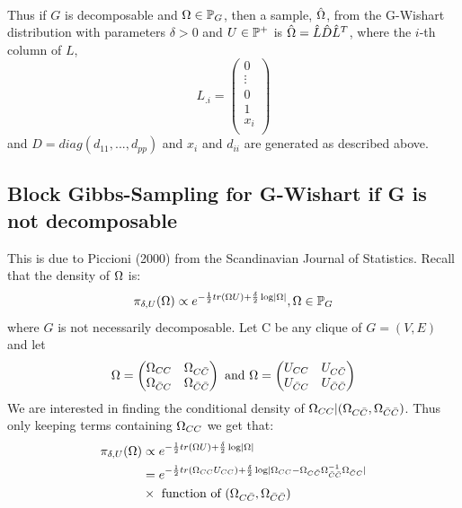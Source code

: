\documentclass[12pt, leqno]{article}
\providecommand{\abs}[1]{\lvert#1\rvert}
\let\oldhat\hat
\renewcommand{\hat}[1]{\oldhat{{#1}}}
\def\om{\ensuremath\Omega}
\def\pd{\ensuremath\mathbb{P}^+}
\def\pg{\ensuremath\mathbb{P}_{{G}}}
\begin{document}
\paragraph{} Thus if $G$ is decomposable and $\om \in \pg$, then a sample, $\hat{\om}$, from
the G-Wishart distribution with parameters $\delta>0$ and $U \in \pd$
is $\hat{\om} = \hat{L}\hat{D}\hat{L}^T$, where the $i$-th column of $L$,
\[
L_{.i} = \begin{pmatrix}0\\
\vdots\\
0\\
1\\
x_i\\
\end{pmatrix}
\]
and $D = diag(d_{11},...,d_{pp})$ and $x_i$ and $d_{ii}$ are generated
as described above.
\subsection{Block Gibbs-Sampling for G-Wishart if G is not decomposable}
This is due to Piccioni
(2000) from the Scandinavian Journal of Statistics. Recall that the
density of $\om$ is:
\[
\pi_{\delta,U}(\om) \propto e^{-\frac{1}{2}tr(\om U) +
  \frac{\delta}{2} \log \abs{\om}}, \om \in \pg
\]
where $G$ is not necessarily decomposable. 
Let C be any clique of $G = (V,E)$ and let 
\begin{align*}
\om = \begin{pmatrix} \om_{CC} & \om_{C\bar{C}} \\
\om_{\bar{C}C} & \om_{\bar{C} \bar{C}} 
\end{pmatrix}
\text{ and }
\om = \begin{pmatrix} U_{CC} & U_{C\bar{C}} \\
U_{\bar{C}C} & U_{\bar{C} \bar{C}} 
\end{pmatrix}
\end{align*}
We are interested in finding the conditional density of
$\om_{CC}|(\om_{C \bar{C}},\om_{\bar{C} \bar{C}})$. Thus only keeping
terms containing $\om_{CC}$ we get that: 
\begin{align*}
\pi_{\delta,U}(\om) &\propto e^{-\frac{1}{2}tr(\om U) +
  \frac{\delta}{2} \log \abs{\om}} \\
&= e^{-\frac{1}{2}tr(\om_{CC}U_{CC}) +
  \frac{\delta}{2} \log \abs{\om_{CC}-\om_{C \bar{C}} \om_{\bar{C}
  \bar{C}}^{-1} \om_{\bar{C} C} }} \\
&\times \text{ function of } (\om_{C \bar{C}},\om_{\bar{C} \bar{C}})
\end{align*}
\end{document}
